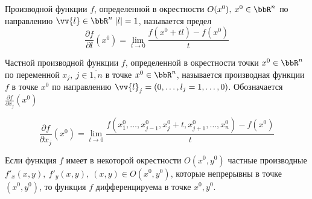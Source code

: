 \begin{defn}
Производной функции $f$, определенной в окрестности $O(x^0), \: x^0 \in \bbR^n$ по направлению $\vv{l} \in \bbR^n \; |l| = 1$, называется предел
$$
\frac{\partial f}{\partial l}(x^0) = \lim\limits_{t \to 0} \frac{f(x^0 + tl) - f(x^0)}{t}
$$
\end{defn}

\begin{defn}
Частной производной функции $f$, определенной в окрестности точки $x^0 \in \bbR^n$ по переменной $x_j, \: j \in \overline{1,n}$ в точке $x^0 \in \bbR^n$, называется производная функции $f$ в точке $x^0$ по направлению $\vv{l}_j = (0, \ldots, l_j = 1, \ldots, 0)$. Обозначается $\frac{\partial f}{\partial x_j}(x^0)$

$$
\frac{\partial f}{\partial x_j}(x^0) = \lim\limits_{t \to 0} \frac{f(x^0_1, \ldots, x^0_{j - 1}, x^0_j + t, x^0_{j + 1}, \ldots, x^0_n) - f(x^0)}{t}  
$$
\end{defn}


\begin{thm} \label{ch8th1}
Если функция $f$ имеет в некоторой окрестности $O(x^0, y^0)$ частные производные $f'_x(x,y), \: f'_y(x,y), \: (x,y) \in O(x^0, y^0)$, которые непрерывны в точке $(x^0, y^0)$, то функция $f$ дифференцируема в точке $x^0, y^0$.
\end{thm}

